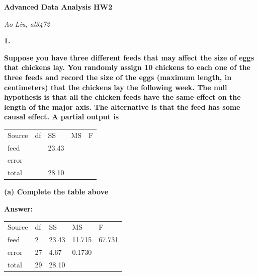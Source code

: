 \documentclass[letterpaper,11pt]{article}
\begin{document}
  \begin{center}
  	\textbf{\Huge{Advanced Data Analysis HW2}}
  \end{center}

  \begin{center}
  	\textsl{Ao Liu, al3472}
  \end{center}


  \bigbreak
  \bigbreak
  \bigbreak



\begin{addmargin}[-2em]{0em}
\large{\textbf{1. }}\end{addmargin}
\begin{addmargin}[-1.1em]{0em} \textbf{Suppose you have three different feeds that may affect the size of eggs that chickens lay. You randomly assign 10 chickens to each one of the three feeds and record the size of the eggs (maximum length, in centimeters) that the chickens lay the following week. The null hypothesis is that all the chicken feeds have the same effect on the length of the major axis. The alternative is that the feed has some causal effect. A partial output is}\par \end{addmargin}


\begin{center}
\begin{tabular}{ p{2cm}p{1cm}p{1cm}p{1cm}p{1cm}}
\centering Source & df & SS & MS & F\\
\centering feed & {} & 23.43 & {} & {}\\
\centering error & {} & {} & {} & {}\\
\centering total & {} & 28.10 & {} & {}\\
\end{tabular}
\end{center}


\begin{addmargin}[-1.1em]{0em} \textbf{(a)  Complete the table above}\par \end{addmargin}

\bigbreak
\begin{addmargin}[-0.5em]{0em}
\textbf{Answer: }\end{addmargin}

\begin{center}
\begin{tabular}{ p{2cm}p{1.5cm}p{1.5cm}p{1.5cm}p{1.5cm}}
\centering Source & df & SS & MS & F\\
\centering feed & 2 & 23.43 & 11.715 & 67.731\\
\centering error & 27 & 4.67 & 0.1730 & {}\\
\centering total & 29 & 28.10 & {} & {}\\
\end{tabular}
\end{center}
\end{document}
